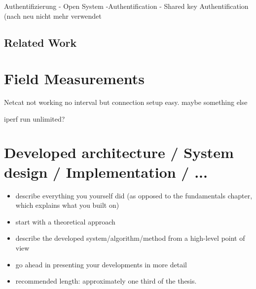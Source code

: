 \documentclass[]{nsm-thesis}
\begin{document}
Authentifizierung
- Open System -Authentification
- Shared key Authentification
(nach neu nicht mehr verwendet

\section{Related Work}





\chapter{Field Measurements}

Netcat not working no interval but connection setup easy. maybe something else

iperf run unlimited? 









\chapter{Developed architecture / System design / Implementation / ...}


\begin{itemize}
\item describe everything you yourself did (as opposed to the fundamentals chapter, which explains what you built on)
\item start with a theoretical approach
\item describe the developed system/algorithm/method from a high-level point of view
\item go ahead in presenting your developments in more detail
\item recommended length: approximately one third of the thesis.
\end{itemize}
\end{document}
